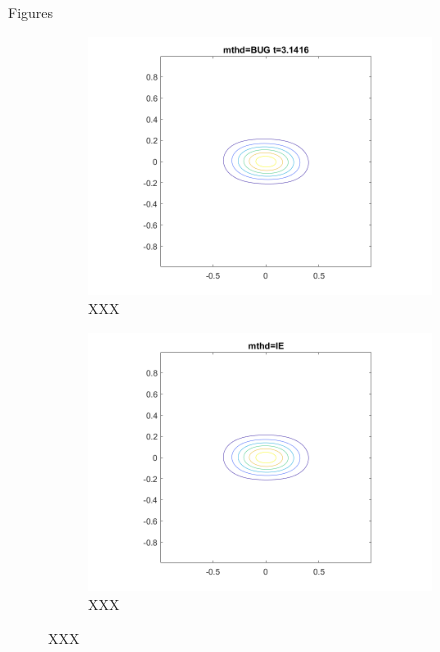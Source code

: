 \documentclass[compress,aspectratio=43]{beamer}
\begin{document}
\begin{frame}{Figures}
    \begin{figure}[htbp]
        \centering
        \begin{subfigure}[b]{0.47\textwidth}
            \centering
            \includegraphics[width=\textwidth]{bug.png}
            \caption{XXX}
            \label{fig:subfig-a}
        \end{subfigure}
        \begin{subfigure}[b]{0.47\textwidth}
            \centering
            \includegraphics[width=\textwidth]{ie.png}
            \caption{XXX}
            \label{fig:subfig-b}
        \end{subfigure}
        \caption{XXX}
        \label{fig:example}
    \end{figure}
\end{frame}
\end{document}
